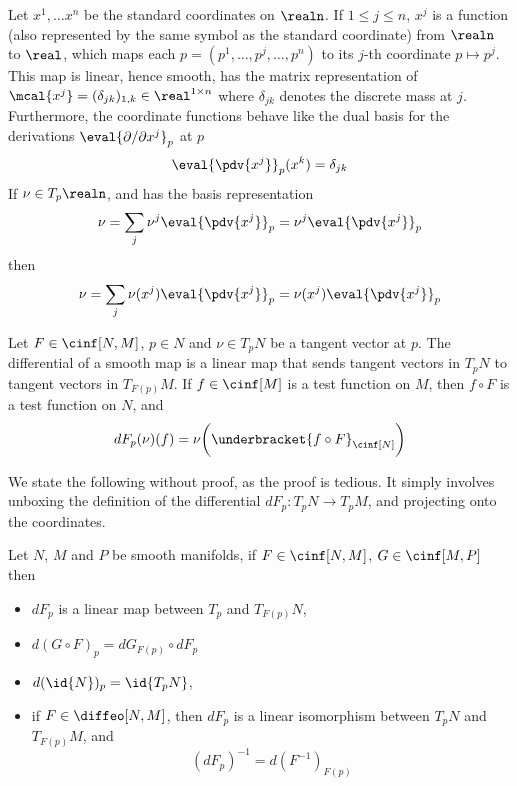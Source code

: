 \documentclass[../main-v2-manifolds.tex]{subfiles}
\begin{document}
\begin{definition}
    Let $x^1,\ldots x^n$ be the standard coordinates on $\realn$. If $1\leq j\leq n$, $x^j$ is a function (also represented by the same symbol as the standard coordinate) from $\realn$ to $\real$, which maps each $p = (p^1,\ldots,p^j,\ldots, p^n)$ to its $j$-th coordinate $p\mapsto p^j$.\\

    This map is linear, hence smooth, has the matrix representation of $\mcal\{x^j\}=(\delta_{jk})_{1,k}\in \real^{1\times n}$ where $\delta_{jk}$ denotes the discrete mass at $j$.\\

    Furthermore, the coordinate functions behave like the dual basis for the derivations $\eval{\partial/\partial x^j}_p$ at $p$
    \[
        \eval{\pdv{x^j}}_{p}(x^k) = \delta_{jk}
    \]
    If $\nu\in T_p\realn$, and has the basis representation
    \[
        \nu = \sum_{j}\nu^j\eval{\pdv{x^j}}_{p} = \nu^j\eval{\pdv{x^j}}_{p}
    \]
    then 
    \begin{equation}\label{lee-chp3:derivation-in-realn-projection-using-coordinate-functions}
        \nu = \sum_j \nu(x^j)\eval{\pdv{x^j}}_{p} = \nu(x^j)\eval{\pdv{x^j}}_{p}
    \end{equation}
\end{definition}

\begin{definition}
    Let $F\in\cinf[N,M]$, $p\in N$ and $\nu\in T_pN$ be a tangent vector at $p$. The differential of a smooth map is a linear map that sends tangent vectors in $T_pN$ to tangent vectors in $T_{F(p)}M$. If $f\in \cinf[M]$ is a test function on $M$, then $f\circ F$ is a test function on $N$, and
    \[
        dF_p(\nu)(f) = \nu\biggl(\underbracket{f\circ F}_{\cinf[N]}\biggr)
    \]
\end{definition}
We state the following without proof, as the proof is tedious. It simply involves unboxing the definition of the differential $dF_p: T_pN\to T_p M$, and projecting onto the coordinates.
\begin{wts}\label{lee-chp3:properties-of-differential}
    Let $N$, $M$ and $P$ be smooth manifolds, if $F\in\cinf[N,M]$, $G\in \cinf[M,P]$ then
    \begin{itemize}
        \item $dF_p$ is a linear map between $T_p$ and $T_{F(p)}N$,
        \item $d(G\circ F)_p = dG_{F(p)}\circ dF_p$
        \item $d({\id{N}})_p=\id{T_pN}$,
        \item if $F\in\diffeo[N,M]$, then $dF_p$ is a linear isomorphism between $T_pN$ and $T_{F(p)}M$, and
        \[
            (dF_p)^{-1}=d(F^{-1})_{F(p)}
        \]
    \end{itemize}
\end{wts}
\end{document}
